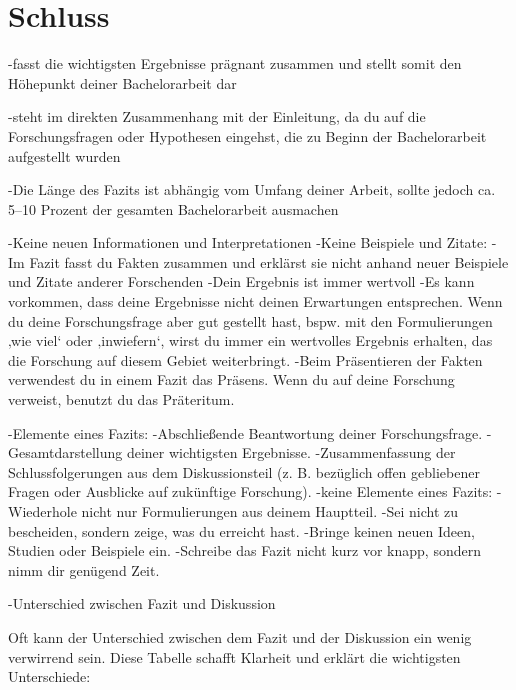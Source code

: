 







\chapter{Schluss}
\label{ch:Schluss}

-fasst die wichtigsten Ergebnisse prägnant zusammen und stellt somit den Höhepunkt deiner Bachelorarbeit dar

-steht im direkten Zusammenhang mit der Einleitung, da du auf die Forschungsfragen oder Hypothesen eingehst, die zu Beginn der Bachelorarbeit aufgestellt wurden

-Die Länge des Fazits ist abhängig vom Umfang deiner Arbeit, sollte jedoch ca. 5–10 Prozent der gesamten Bachelorarbeit ausmachen

-Keine neuen Informationen und Interpretationen
-Keine Beispiele und Zitate:
    -Im Fazit fasst du Fakten zusammen und erklärst sie nicht anhand neuer Beispiele und Zitate anderer Forschenden
-Dein Ergebnis ist immer wertvoll
    -Es kann vorkommen, dass deine Ergebnisse nicht deinen Erwartungen entsprechen. Wenn du deine Forschungsfrage aber gut gestellt hast, bspw. mit den Formulierungen ‚wie viel‘ oder ‚inwiefern‘, wirst du immer ein wertvolles Ergebnis erhalten, das die Forschung auf diesem Gebiet weiterbringt.
-Beim Präsentieren der Fakten verwendest du in einem Fazit das Präsens. Wenn du auf deine Forschung verweist, benutzt du das Präteritum.

-Elemente eines Fazits:
    -Abschließende Beantwortung deiner Forschungsfrage.
    -Gesamtdarstellung deiner wichtigsten Ergebnisse.
    -Zusammenfassung der Schlussfolgerungen aus dem Diskussionsteil (z. B. bezüglich offen gebliebener Fragen oder Ausblicke auf zukünftige Forschung).
-keine Elemente eines Fazits:
    -Wiederhole nicht nur Formulierungen aus deinem Hauptteil.
    -Sei nicht zu bescheiden, sondern zeige, was du erreicht hast.
    -Bringe keinen neuen Ideen, Studien oder Beispiele ein.
    -Schreibe das Fazit nicht kurz vor knapp, sondern nimm dir genügend Zeit.
    
-Unterschied zwischen Fazit und Diskussion

Oft kann der Unterschied zwischen dem Fazit und der Diskussion ein wenig verwirrend sein. Diese Tabelle schafft Klarheit und erklärt die wichtigsten Unterschiede:

